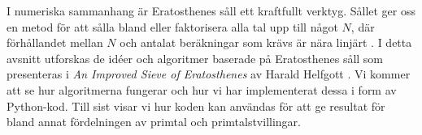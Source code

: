 
I numeriska sammanhang är Eratosthenes såll ett kraftfullt verktyg.
Sållet ger oss en metod för att sålla bland eller faktorisera alla tal upp till något $N$,
där förhållandet mellan $N$ och antalat beräkningar som krävs är nära linjärt \cite[s. 333]{HaraldSieve}.
I detta avsnitt utforskas de idéer och algoritmer baserade på Eratosthenes såll som presenteras i \textit{An Improved Sieve of Eratosthenes} av Harald Helfgott \cite{HaraldSieve}.
Vi kommer att se hur algoritmerna fungerar och hur vi har implementerat dessa i form av Python-kod.
Till sist visar vi hur koden kan användas för att ge resultat för bland annat fördelningen av primtal och primtalstvillingar.



